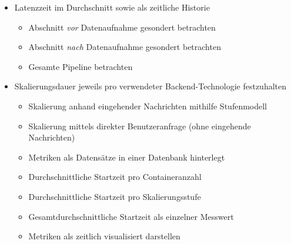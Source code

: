 \begin{itemize}
  \item Latenzzeit im Durchschnitt sowie als zeitliche Historie
  \begin{itemize}
    \item Abschnitt \emph{vor} Datenaufnahme gesondert betrachten
    \item Abschnitt \emph{nach} Datenaufnahme gesondert betrachten
    \item Gesamte Pipeline betrachten
  \end{itemize}
  \item Skalierungsdauer jeweils pro verwendeter Backend-Technologie festzuhalten
  \begin{itemize}
    \item Skalierung anhand eingehender Nachrichten mithilfe Stufenmodell
    \item Skalierung mittels direkter Benutzeranfrage (ohne eingehende Nachrichten)
    \item Metriken als Datensätze in einer Datenbank hinterlegt
    \item Durchschnittliche Startzeit pro Containeranzahl 
    \item Durchschnittliche Startzeit pro Skalierungsstufe 
    \item Gesamtdurchschnittliche Startzeit als einzelner Messwert
    \item Metriken als zeitlich visualisiert darstellen
  \end{itemize}
\end{itemize}
